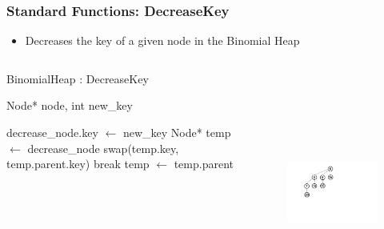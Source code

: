 \documentclass[13pt]{beamer}
\begin{document}
\begin{frame}
\frametitle{Standard Functions: DecreaseKey}
  \begin{itemize}
    \item Decreases the key of a given node in the Binomial Heap 
  \end{itemize}

  \begin{columns}[T] %
    \begin{column}[T]{6cm} %
        \begin{algorithm}[H]
        \small
        \caption{BinomialHeap : DecreaseKey}
        \begin{algorithmic}
          \REQUIRE Node* node, int new\_key

          \STATE decrease\_node.key $\leftarrow$ new\_key
          \STATE Node* temp $\leftarrow$ decrease\_node
                \STATE swap(temp.key, temp.parent.key)
              \ELSE
                \STATE break
              \ENDIF
              \STATE temp $\leftarrow$ temp.parent
          \ENDWHILE
        \end{algorithmic}
        \end{algorithm}
    \end{column}
    \begin{column}[T]{7cm} %
      \begin{figure}
        \includegraphics[height=8cm]{./img/decreasekeyA.png}
      \end{figure}
    \end{column}
  \end{columns}

\end{frame}
\end{document}
